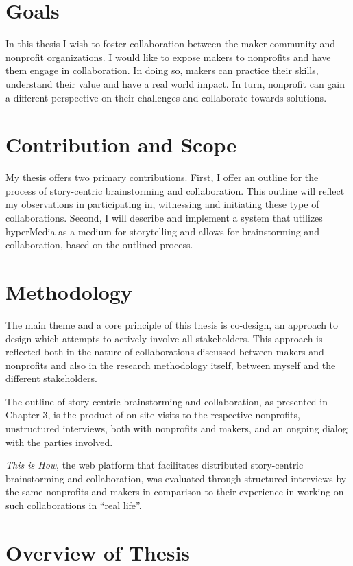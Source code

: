 \section{Goals}
In this thesis I wish to foster collaboration between the maker community and nonprofit organizations. I would like to expose makers to nonprofits and have them engage in collaboration. In doing so, makers can practice their skills, understand their value and have a real world impact. In turn, nonprofit can gain a different perspective on their challenges and collaborate towards solutions. 

\section{Contribution and Scope}
My thesis offers two primary contributions. First, I offer an outline for the process of story-centric brainstorming and collaboration. This outline will reflect my observations in participating in, witnessing and initiating these type of collaborations. Second, I will describe and implement a system that utilizes hyperMedia as a medium for storytelling and allows for brainstorming and collaboration, based on the outlined process. 

\section{Methodology} 
The main theme and a core principle of this thesis is co-design, an approach to design which attempts to actively involve all stakeholders. This approach is reflected both in the nature of collaborations discussed between makers and nonprofits and also in the research methodology itself, between myself and the different stakeholders. 

The outline of story centric brainstorming and collaboration, as presented in Chapter 3, is the product of on site visits to the respective nonprofits, unstructured interviews, both with nonprofits and makers, and an ongoing dialog with the parties involved. 

\textit{This is How}, the web platform that facilitates distributed story-centric brainstorming and collaboration, was evaluated through structured interviews by the same nonprofits and makers in comparison to their experience in working on such collaborations in ``real life''. 

\section{Overview of Thesis}


